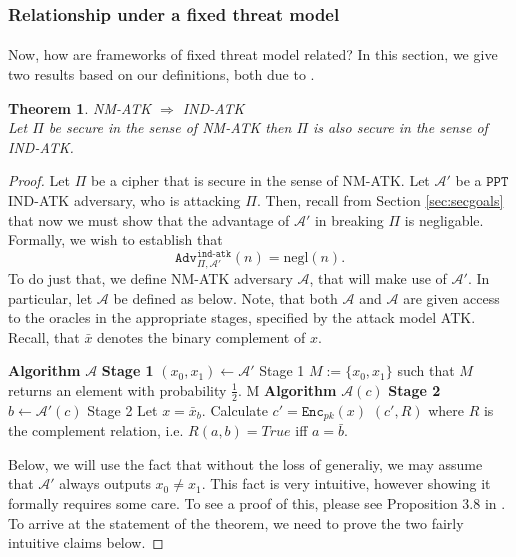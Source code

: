 \documentclass{article}
\newtheorem{theorem}{Theorem}[section]
\theoremstyle{definition}
\newcommand{\Enc}{\texttt{Enc}}
\newcommand{\A}{\mathcal{A}}
\newcommand{\PPT}{\texttt{PPT}}
\newcommand{\negl}{\text{negl}}
\newcommand{\Adv}[2]{\texttt{Adv}^{\texttt{#1}}_{#2}}
\begin{document}
\subsubsection{Relationship under a fixed threat model}
\paragraph{} Now, how are frameworks of fixed threat model related? In this
section, we give two results based on our definitions, both due to \cite{bellaresecurityrelations}.
\begin{theorem}{NM-ATK $\Rightarrow$ IND-ATK}\\
  \label{thm:nm_imply_ind}
  Let $\Pi$ be secure in the sense of NM-ATK then $\Pi$ is also secure in the
  sense of IND-ATK.
\end{theorem}
\begin{proof}
  Let $\Pi$ be a cipher that is secure in the sense of NM-ATK. Let $\A'$ be
  a $\PPT$ IND-ATK adversary, who is attacking $\Pi$. Then, recall from Section
  \ref{sec:secgoals} that now we must show that the advantage of $\A'$ in
  breaking $\Pi$ is negligable. Formally, we wish to establish that
  \[
    \Adv{ind-atk}{\Pi, \A'}(n) = \negl(n).
  \]
  To do just that, we define NM-ATK adversary $\A$, that will make use of $\A'$.
  In particular, let $\A$ be defined as below. Note, that both $\A$ and $\A$ are
  given access to the oracles in the appropriate stages, specified by the attack
  model ATK. Recall, that $\bar{x}$ denotes the binary complement of $x$.\\
  \begin{algorithmic}
    \State \textbf{Algorithm} $\A$ \textbf{Stage 1}
    \State $(x_0, x_1) \leftarrow \A'$ Stage 1
    \State $M:= \{x_0, x_1\}$ such that $M$ returns an element with probability $\frac12$.
    \State \Return M
    \State
    \State \textbf{Algorithm} $\A(c)$ \textbf{Stage 2}
    \State $b \leftarrow \A'(c)$ Stage 2
    \State Let $x = \bar{x}_b$. Calculate $c' = \Enc_{pk}(x)$
    \State \Return $(c', R)$ where $R$ is the complement relation, i.e. $R(a,
    b) = True$ iff $a = \bar{b}$.
    \State
  \end{algorithmic}
  Below, we will use the fact that without the loss of generaliy, we may assume
  that $\A'$ always outputs $x_0 \neq x_1$. This fact is very intuitive, however
  showing it formally requires some care. To see a proof of this, please see
  Proposition 3.8 in \cite{bellaresecurityrelations}. To arrive at the statement
  of the theorem, we need to prove the two fairly intuitive claims below.

\end{proof}
\end{document}
